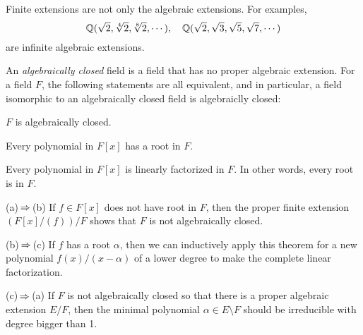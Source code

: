 \documentclass{../../large}
\begin{document}
\begin{ex}
Finite extensions are not only the algebraic extensions.
For examples,
\[\mathbb{Q}(\sqrt2,\sqrt[4]2,\sqrt[8]2,\cdots),\quad\mathbb{Q}(\sqrt2,\sqrt3,\sqrt5,\sqrt7,\cdots)\]
are infinite algebraic extensions.
\end{ex}










\begin{prb}
An \emph{algebraically closed} field is a field that has no proper algebraic extension.
For a field $F$, the following statements are all equivalent, and in particular, a field isomorphic to an algebraically closed field is algebraiclly closed:
\begin{parts}
\item $F$ is algebraically closed.
\item Every polynomial in $F[x]$ has a root in $F$.
\item Every polynomial in $F[x]$ is linearly factorized in $F$. In other words, every root is in $F$.
\end{parts}
\end{prb}
\begin{pf}
(a)$\impl$(b)
If $f\in F[x]$ does not have root in $F$, then the proper finite extension $(F[x]/(f))/F$ shows that $F$ is not algebraically closed.

(b)$\impl$(c)
If $f$ has a root $\alpha$, then we can inductively apply this theorem for a new polynomial $f(x)/(x-\alpha)$ of a lower degree to make the complete linear factorization.

(c)$\impl$(a)
If $F$ is not algebraically closed so that there is a proper algebraic extension $E/F$, then the minimal polynomial $\alpha\in E\setminus F$ should be irreducible with degree bigger than 1.
\end{pf}
\end{document}
